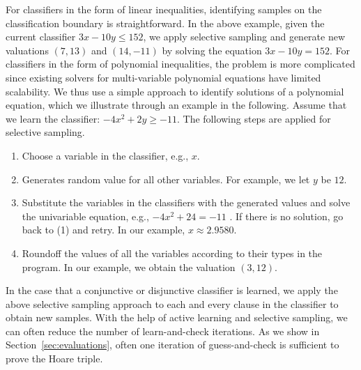 For classifiers in the form of linear inequalities, identifying samples on the classification boundary is straightforward. In the above example, given the current classifier $3x-10y \leq 152$, we apply selective sampling and generate new valuations $(7, 13)$ and $(14, -11)$ by solving the equation $3x-10y = 152$. %
For classifiers in the form of polynomial inequalities, the problem is more complicated since existing solvers for multi-variable polynomial equations have limited scalability. We thus use a simple approach to identify solutions of a polynomial equation, which we illustrate through an example in the following. Assume that we learn the classifier: $-4x^2+2y \geq -11$. The following steps are applied for selective sampling.
\begin{enumerate}
\item Choose a variable in the classifier, e.g., $x$.
\item Generates random value for all other variables. For example, we let $y$ be $12$.
\item Substitute the variables in the classifiers with the generated values and solve the univariable equation, e.g., $-4x^2+24 = -11$ . If there is no solution, go back to (1) and retry.
In our example, $x \approx 2.9580$.
\item Roundoff the values of all the variables according to their types in the program. In our example, we obtain the valuation $(3, 12)$.
\end{enumerate}
In the case that a conjunctive or disjunctive classifier is learned, we apply the above selective sampling approach to each and every clause in the classifier to obtain new samples. With the help of active learning and selective sampling, we can often reduce the number of learn-and-check iterations. As we show in Section~\ref{sec:evaluations}, often one iteration of guess-and-check is sufficient to prove the Hoare triple.

